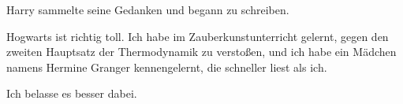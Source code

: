 Harry sammelte seine Gedanken und begann zu schreiben.

\begin{writtenNote}

Hogwarts ist richtig toll. Ich habe im Zauberkunstunterricht gelernt, gegen den zweiten Hauptsatz der Thermodynamik zu verstoßen, und ich habe ein Mädchen namens Hermine Granger kennengelernt, die schneller liest als ich.

Ich belasse es besser dabei.

\end{writtenNote}

